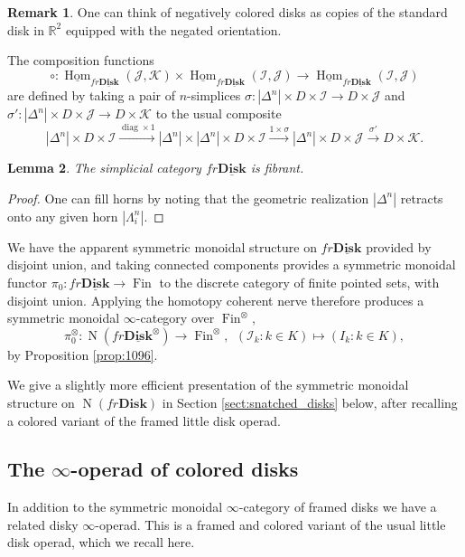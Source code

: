 \documentclass[reqno]{amsart}
\newtheorem{lemma}{Lemma}[section]
\theoremstyle{definition}
\newtheorem{remark}[lemma]{Remark}
\newcommand{\mbb}[1]{\mathbb{#1}}
\newcommand{\mcl}[1]{\mathcal{#1}}
\newcommand{\opn}[1]{\operatorname{#1}}
\newcommand{\ot}{\otimes}
\newcommand{\uHom}{\underline{\operatorname{Hom}}}
\newcommand{\Disk}{\mathbf{Disk}}
\newcommand{\uDisk}{\underline{\mathbf{Disk}}}
\DeclareMathOperator{\Fin}{Fin}
\renewcommand{\1}{\mathbf{1}}
\begin{document}
\begin{remark}
One can think of negatively colored disks as copies of the standard disk in $\mbb{R}^2$ equipped with the negated orientation.
\end{remark}

The composition functions
\[
\circ:\uHom_{fr\uDisk}(\mcl{J},\mcl{K})\times\uHom_{fr\uDisk}(\mcl{I},\mcl{J})\to \uHom_{fr\uDisk}(\mcl{I},\mcl{J})
\]
are defined by taking a pair of $n$-simplices $\sigma:|\Delta^n|\times D\times \mcl{I}\to D\times \mcl{J}$ and $\sigma':|\Delta^n|\times D\times \mcl{J}\to D\times \mcl{K}$ to the usual composite
\[
|\Delta^n|\times D\times \mcl{I}\overset{\opn{diag}\times 1}\to |\Delta^n|\times |\Delta^n|\times D\times \mcl{I}\overset{1\times \sigma}\to |\Delta^n|\times D\times \mcl{J}\overset{\sigma'}\to D\times \mcl{K}.
\]

\begin{lemma}
The simplicial category $fr\uDisk$ is fibrant.
\end{lemma}

\begin{proof}
One can fill horns by noting that the geometric realization $|\Delta^n|$ retracts onto any given horn $|\Lambda^n_i|$.
\end{proof}

We have the apparent symmetric monoidal structure on $fr\uDisk$ provided by disjoint union, and taking connected components provides a symmetric monoidal functor $\pi_0:fr\uDisk\to \opn{Fin}$ to the discrete category of finite pointed sets, with disjoint union. Applying the homotopy coherent nerve therefore produces a symmetric monoidal $\infty$-category over $\Fin^{\ot}$,
\[
\pi_0^{\ot}:\opn{N}(fr\uDisk^{\ot})\to \opn{Fin}^{\ot},\ \ (\mcl{I}_k:k\in K)\mapsto (I_k:k\in K),
\]
by Proposition \ref{prop:1096}.

We give a slightly more efficient presentation of the symmetric monoidal structure on $\opn{N}(fr\Disk)$ in Section \ref{sect:snatched_disks} below, after recalling a colored variant of the framed little disk operad.

\subsection{The $\infty$-operad of colored disks}
\label{sect:fr_e2}

In addition to the symmetric monoidal $\infty$-category of framed disks we have a related disky $\infty$-operad. This is a framed and colored variant of the usual little disk operad, which we recall here.
\par
\end{document}
